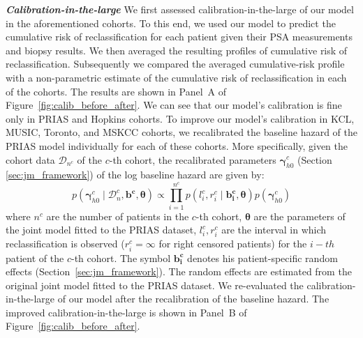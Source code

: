 \textbf{\textit{Calibration-in-the-large}}
We first assessed calibration-in-the-large \citep{steyerberg2010assessing} of our model in the aforementioned cohorts. To this end, we used our model to predict the cumulative risk of reclassification for each patient given their PSA measurements and biopsy results. We then averaged the resulting profiles of cumulative risk of reclassification. Subsequently we compared the averaged cumulative-risk profile with a non-parametric estimate \citep{turnbull1976empirical} of the cumulative risk of reclassification in each of the cohorts. The results are shown in Panel~A of Figure~\ref{fig:calib_before_after}. We can see that our model's calibration is fine only in PRIAS and Hopkins cohorts. To improve our model's calibration in KCL, MUSIC, Toronto, and MSKCC cohorts, we recalibrated the baseline hazard of the PRIAS model individually for each of these cohorts. More specifically, given the cohort data $\mathcal{D}_{n^c}$ of the $c$-th cohort, the recalibrated parameters $\boldsymbol{\gamma}_{h0}^c$ (Section \ref{sec:jm_framework}) of the log baseline hazard are given by:
\begin{equation}
p(\boldsymbol{\gamma}_{h0}^c \mid \mathcal{D}_n^c, \boldsymbol{b^c},  \boldsymbol{\theta}) \propto  \prod_{i=1}^{n^c} p(l_i^c, r_i^c \mid \boldsymbol{b^c_i}, \boldsymbol{\theta}) p(\boldsymbol{\gamma}_{h0}^c)
\end{equation}
where $n^c$ are the number of patients in the $c$-th cohort, $\boldsymbol{\theta}$ are the parameters of the joint model fitted to the PRIAS dataset, $l_i^c, r_i^c$ are the interval in which reclassification is observed ($r_i^c = \infty$ for right censored patients) for the $i-th$ patient of the $c$-th cohort. The symbol $\boldsymbol{b^c_i}$ denotes his patient-specific random effects (Section~\ref{sec:jm_framework}). The random effects are estimated from the original joint model fitted to the PRIAS dataset. We re-evaluated the calibration-in-the-large of our model after the recalibration of the baseline hazard. The improved calibration-in-the-large is shown in Panel~B of Figure~\ref{fig:calib_before_after}.

